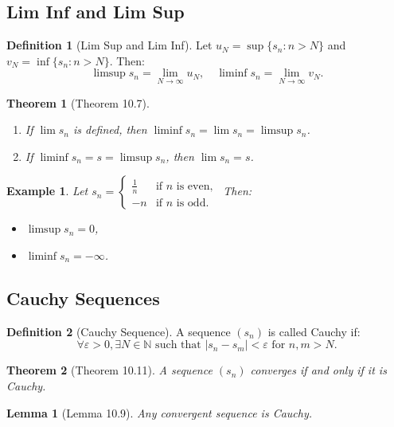 \documentclass[9pt]{article}
\theoremstyle{definition}
\newtheorem{definition}{Definition}
\theoremstyle{plain}
\newtheorem{theorem}{Theorem}
\newtheorem{example}{Example}
\newtheorem{lemma}{Lemma}
\begin{document}
\subsection*{Lim Inf and Lim Sup}
\begin{definition}[Lim Sup and Lim Inf]
Let \( u_N = \sup\{s_n : n > N\} \) and \( v_N = \inf\{s_n : n > N\} \). Then:
\[
\limsup s_n = \lim_{N \to \infty} u_N, \quad \liminf s_n = \lim_{N \to \infty} v_N.
\]
\end{definition}

\begin{theorem}[Theorem 10.7]
\leavevmode
\begin{enumerate}
    \item If \( \lim s_n \) is defined, then \( \liminf s_n = \lim s_n = \limsup s_n \).
    \item If \( \liminf s_n = s = \limsup s_n \), then \( \lim s_n = s \).
\end{enumerate}
\end{theorem}

\begin{example}
Let \( s_n = 
\begin{cases} 
\frac{1}{n} & \text{if } n \text{ is even}, \\
-n & \text{if } n \text{ is odd}.
\end{cases}
\)
Then:
\begin{itemize}
    \item \( \limsup s_n = 0 \),
    \item \( \liminf s_n = -\infty \).
\end{itemize}
\end{example}

\subsection*{Cauchy Sequences}
\begin{definition}[Cauchy Sequence]
A sequence \( (s_n) \) is called Cauchy if:
\[
\forall \varepsilon > 0, \exists N \in \mathbb{N} \text{ such that } |s_n - s_m| < \varepsilon \text{ for } n, m > N.
\]
\end{definition}

\begin{theorem}[Theorem 10.11]
A sequence \( (s_n) \) converges if and only if it is Cauchy.
\end{theorem}

\begin{lemma}[Lemma 10.9]
Any convergent sequence is Cauchy.
\end{lemma}
\end{document}
